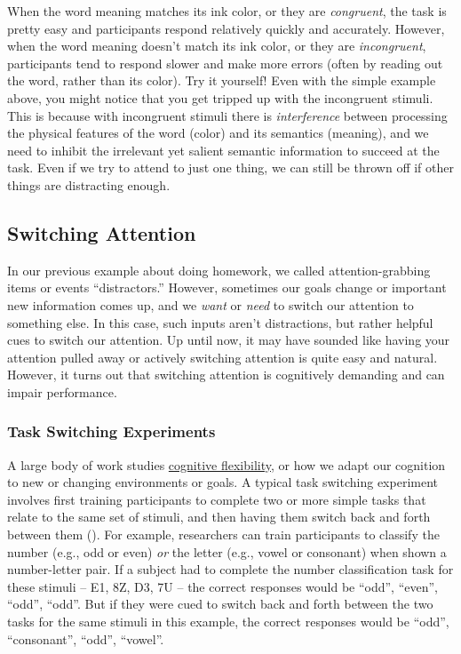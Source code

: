\documentclass[
]{krantz}
\begin{document}
When the word meaning matches its ink color, or they are \emph{congruent}, the task is pretty easy and participants respond relatively quickly and accurately. However, when the word meaning doesn't match its ink color, or they are \emph{incongruent}, participants tend to respond slower and make more errors (often by reading out the word, rather than its color). Try it yourself! Even with the simple example above, you might notice that you get tripped up with the incongruent stimuli. This is because with incongruent stimuli there is \emph{interference} between processing the physical features of the word (color) and its semantics (meaning), and we need to inhibit the irrelevant yet salient semantic information to succeed at the task. Even if we try to attend to just one thing, we can still be thrown off if other things are distracting enough.

\subsection*{Switching Attention}\label{switching-attention}


In our previous example about doing homework, we called attention-grabbing items or events ``distractors.'' However, sometimes our goals change or important new information comes up, and we \emph{want} or \emph{need} to switch our attention to something else. In this case, such inputs aren't distractions, but rather helpful cues to switch our attention. Up until now, it may have sounded like having your attention pulled away or actively switching attention is quite easy and natural. However, it turns out that switching attention is cognitively demanding and can impair performance.

\subsubsection*{Task Switching Experiments}\label{task-switching-experiments}


A large body of work studies \hyperref[cognitive-flexibility]{cognitive flexibility}, or how we adapt our cognition to new or changing environments or goals. A typical task switching experiment involves first training participants to complete two or more simple tasks that relate to the same set of stimuli, and then having them switch back and forth between them (). For example, researchers can train participants to classify the number (e.g., odd or even) \emph{or} the letter (e.g., vowel or consonant) when shown a number-letter pair. If a subject had to complete the number classification task for these stimuli -- E1, 8Z, D3, 7U -- the correct responses would be ``odd'', ``even'', ``odd'', ``odd''. But if they were cued to switch back and forth between the two tasks for the same stimuli in this example, the correct responses would be ``odd'', ``consonant'', ``odd'', ``vowel''.
\end{document}

